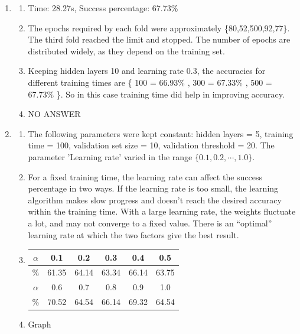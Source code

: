 \documentclass[11pt]{article}
\begin{document}
\begin{enumerate}
		\item
			\begin{enumerate}
				\item Time: 28.27s, Success percentage: 67.73\%
				\item The epochs required by each fold were approximately \{80,52,500,92,77\}. The
				third fold reached the limit and stopped. The number of epochs are distributed
				widely, as they depend on the training set.
				\item Keeping hidden layers 10 and learning rate 0.3, the accuracies for different
				training times are \{ 100 = 66.93\% , 300 = 67.33\% , 500 = 67.73\% \}. So in
				this case training time did help in improving accuracy.
				\item NO ANSWER
			\end{enumerate}	
		
		\item
			\begin{enumerate}
				\item The following parameters were kept constant: hidden layers = 5, training time = 100,
					validation set size = 10, validation threshold = 20. The parameter 'Learning rate'
					varied in the range $\{0.1,0.2,\cdots,1.0\}$.
				
				\item For a fixed training time, the learning rate can affect the success percentage in
				two ways. If the learning rate is too small, the learning algorithm makes slow
				progress and doesn't reach the desired accuracy within the training time. With a large
				learning rate, the weights fluctuate a lot, and may not converge to a fixed value.
				There is an ``optimal'' learning rate at which the two factors give the best result.
					
				\item
						\begin{tabular}{|c|c|c|c|c|c|}
							\hline
								$\alpha$& 0.1 	 & 0.2   & 0.3   & 0.4 	 & 0.5 	 \\
							\hline
								\%		  & 61.35  & 64.14 & 63.34 & 66.14 & 63.75 \\
							\hline
							\hline
								$\alpha$& 0.6 	 & 0.7 	 & 0.8 	 & 0.9   & 1.0   \\
							\hline
								\%		  &	70.52 & 64.54 & 66.14 & 69.32 & 64.54  \\
							\hline
						\end{tabular}
				
				\item Graph\\
					

\end{enumerate}
\end{enumerate}
\end{document}
